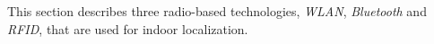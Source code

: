 This section describes three radio-based technologies, \textit{WLAN}, \textit{Bluetooth} and \textit{RFID}, that are used for indoor localization.